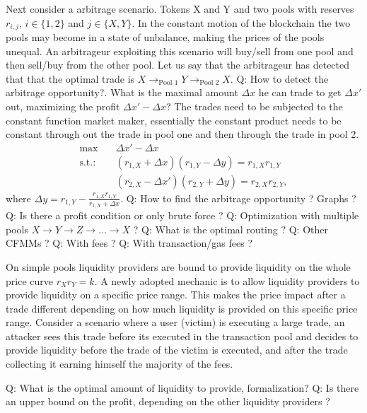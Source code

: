 Next consider a arbitrage scenario. Tokens X and Y and two pools with
reserves $r_{i, j}$, $i \in \{1, 2\}$ and $j\in \{X, Y\}$. In the constant
motion of the blockchain the two pools may become in a state of unbalance,
making the prices of the pools unequal. An arbitrageur exploiting this
scenario will buy/sell from one pool and then sell/buy from the other pool.
Let us say that the arbitrageur has detected that that the optimal trade is
$X \to_{\text{Pool 1}} Y \to_{\text{Pool 2}} X$. Q: How to detect the
arbitrage opportunity?. What is the maximal amount $\Delta x$ he can trade to
get $\Delta x'$ out, maximizing the profit $\Delta x' - \Delta x$? The trades
need to be subjected to the constant function market maker, essentially the
constant product needs to be constant through out the trade in pool one and
then through the trade in pool 2.
\begin{align}
    \max &\quad \Delta x' - \Delta x \\
    \text{s.t.:}&\quad(r_{1,X} + \Delta x)(r_{1,Y} - \Delta y) =
    r_{1,X}r_{1,Y} \\
    &\quad(r_{2,X} - \Delta x')(r_{2,Y} + \Delta y) = r_{2,X}r_{2,Y},
\end{align}
where $\Delta y = r_{1,Y} - \frac{r_{1,X}r_{1,Y}}{r_{1,X} + \Delta
x}$.\newline
Q: How to find the arbitrage opportunity ? Graphs ? \newline
Q: Is there a profit condition or only brute force ? \newline
Q: Optimization with multiple pools $X\to Y \to Z \to \ldots \to X$ ? \newline
Q: What is the optimal routing ? \newline
Q: Other CFMMs ? \newline
Q: With fees ? \newline
Q: With transaction/gas fees ?

On simple pools liquidity providers are bound to provide liquidity on the
whole price curve $r_Xr_Y = k$. A newly adopted mechanic is to allow
liquidity providers to provide liquidity on a specific price range. This
makes the price impact after a trade different depending on how much
liquidity is provided on this specific price range. Consider a scenario where
a user (victim) is executing a large trade, an attacker sees this trade
before its executed in the transaction pool and decides to provide liquidity
before the trade of the victim is executed, and after the trade collecting it
earning himself the majority of the fees.\newline

Q: What is the optimal amount of liquidity to provide, formalization? \newline
Q: Is there an upper bound on the profit, depending on the other liquidity
providers ?







